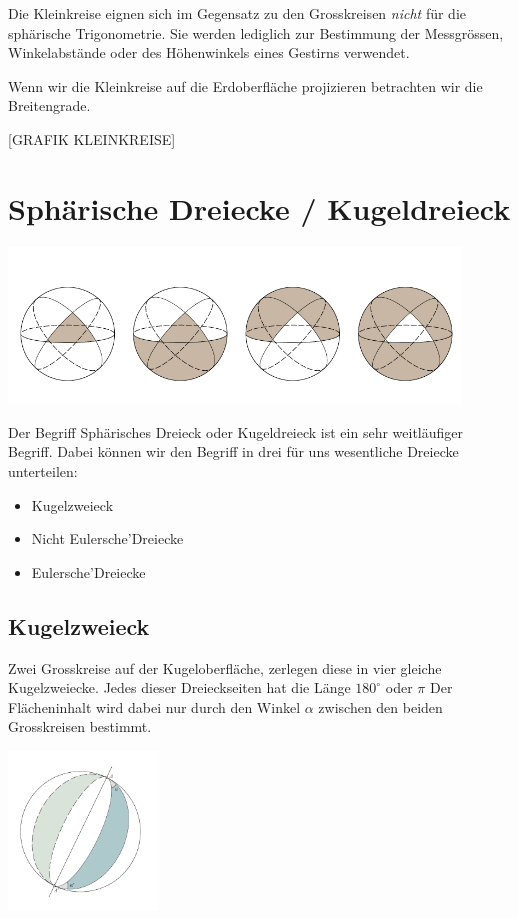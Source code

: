\begin{refsection}
Die Kleinkreise eignen sich im Gegensatz zu den Grosskreisen \textit{nicht} für die sphärische Trigonometrie. 
Sie werden lediglich zur Bestimmung der Messgrössen, Winkelabstände oder des Höhenwinkels eines Gestirns verwendet. 

Wenn wir die Kleinkreise auf die Erdoberfläche projizieren betrachten wir die Breitengrade.

[GRAFIK KLEINKREISE]


\section{Sphärische Dreiecke / Kugeldreieck}

\begin{center}
        \includegraphics[width=0.9\textwidth]{kugel/Dreieckarten.jpg}
\end{center}

Der Begriff Sphärisches Dreieck oder Kugeldreieck ist ein sehr weitläufiger Begriff. 
Dabei können wir den Begriff in drei für uns wesentliche Dreiecke unterteilen:

\begin{itemize}
\item Kugelzweieck
\item Nicht Eulersche’Dreiecke
\item Eulersche’Dreiecke
\end{itemize}

\subsection{Kugelzweieck}

Zwei Grosskreise auf der Kugeloberfläche, zerlegen diese in vier gleiche Kugelzweiecke. 
Jedes dieser Dreieckseiten hat die Länge
$180^{\circ}$ oder $\pi$
Der Flächeninhalt wird dabei nur durch den Winkel $\alpha$ zwischen den beiden Grosskreisen bestimmt.

\begin{center}
        \includegraphics[width=0.3\textwidth]{kugel/Zweieck.jpg}
\end{center}


\end{refsection}
